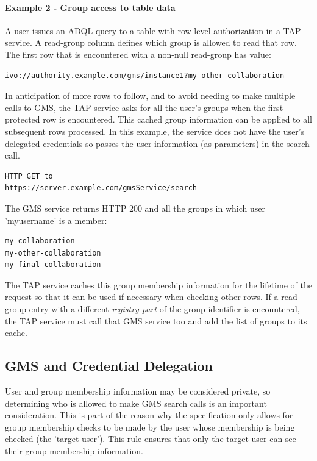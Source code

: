 \documentclass[11pt,a4paper]{ivoa}
\begin{document}
\paragraph{Example 2 - Group access to table data}

A user issues an ADQL query to a table with row-level authorization in a TAP service.  A read-group column defines which group is allowed to read that row.  The first row that is encountered with a non-null read-group has value:

\begin{verbatim}
ivo://authority.example.com/gms/instance1?my-other-collaboration
\end{verbatim}

In anticipation of more rows to follow, and to avoid needing to make multiple calls to GMS, the TAP service asks for all the user's groups when the first protected row is encountered.  This cached group information can be applied to all subsequent rows processed.  In this example, the service does not have the user's delegated credentials so passes the user information (as parameters) in the search call.

\begin{verbatim}
HTTP GET to
https://server.example.com/gmsService/search
\end{verbatim}

The GMS service returns HTTP 200 and all the groups in which user 'myusername' is a member:

\begin{verbatim}
my-collaboration
my-other-collaboration
my-final-collaboration
\end{verbatim}

The TAP service caches this group membership information for the lifetime of the request so that it can be used if necessary when checking other rows.  If a read-group entry with a different \emph{registry part} of the group identifier is encountered, the TAP service must call that GMS service too and add the list of groups to its cache.

\subsection {GMS and Credential Delegation}
\label{subsec:creddel}

User and group membership information may be considered private, so determining who is allowed to make GMS search calls is an important consideration.  This is part of the reason why the specification only allows for group membership checks to be made by the user whose membership is being checked (the 'target user').  This rule ensures that only the target user can see their group membership information.
\end{document}
